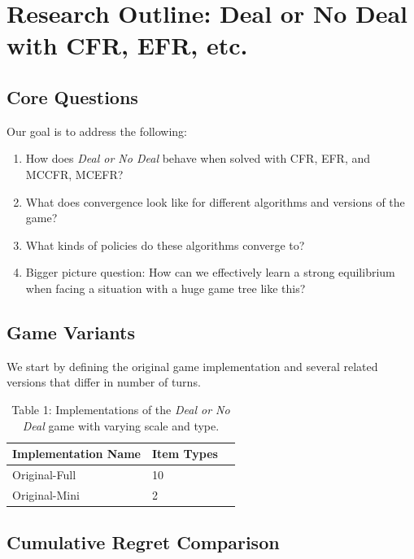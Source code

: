 \documentclass[11pt]{article}
\begin{document}
\section*{Research Outline: Deal or No Deal with CFR, EFR, etc.}

\subsection*{Core Questions}

Our goal is to address the following:

\begin{enumerate}
    \item How does \textit{Deal or No Deal} behave when solved with CFR, EFR, and MCCFR, MCEFR?
    \item What does convergence look like for different algorithms and versions of the game?
    \item What kinds of policies do these algorithms converge to?
    \item Bigger picture question: How can we effectively learn a strong equilibrium when facing a situation with a huge game tree like this?
\end{enumerate}

\subsection*{Game Variants}

We start by defining the original game implementation and several related versions that differ in number of turns.


\begin{table}[H]
\centering
\begin{tabular}{@{}lll@{}}
\toprule
\textbf{Implementation Name} & \textbf{Item Types}\\
\midrule
Original-Full   & 10 \\
Original-Mini   & 2   \\
\bottomrule
\end{tabular}
\caption*{Table 1: Implementations of the \textit{Deal or No Deal} game with varying scale and type.}
\end{table}

\subsection*{Cumulative Regret Comparison}
\end{document}
